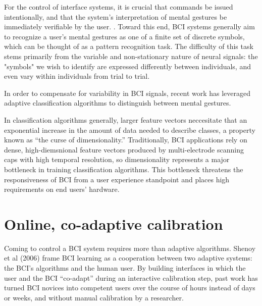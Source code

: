 For the control of interface systems, it is crucial that commands be issued intentionally, and that the system's interpretation of mental gestures be immediately verifiable by the user. \cite{millan_combining_2010,ali_empirical_2014}. Toward this end, BCI systems generally aim to recognize a user's mental gestures as one of a finite set of discrete symbols, which can be thought of as a pattern recognition task. \cite{lotte_review_2007} The difficulty of this task stems primarily from the variable and non-stationary nature of neural signals: the "symbols" we wish to identify are expressed differently between individuals, and even vary within individuals from trial to trial. \cite{vidaurre_fully_2006,vidaurre_machine-learning-based_2011} 

In order to compensate for variability in BCI signals, recent work has leveraged adaptive classification algorithms to distinguish between mental gestures. \cite{lotte_review_2007,vidaurre_machine-learning-based_2011} 


In classification algorithms generally, larger feature vectors neccesitate that an exponential increase in the amount of data needed to describe classes, a property known as ``the curse of dimensionality.'' \cite{jain_statistical_2000,raudys_small_1991} Traditionally, BCI applications rely on dense, high-diemsnional feature vectors produced by multi-electrode scanning caps with high temporal resolution, so dimensionality represents a major bottleneck in training classification algorithms. This bottleneck threatens the responsiveness of BCI from a user experience standpoint and places high requirements on end users' hardware.

\section{Online, co-adaptive calibration}

Coming to control a BCI system requires more than adaptive algorithms. Shenoy et al (2006) frame BCI learning as a cooperation between two adaptive systems: the BCI's algorithms and the human user. \cite{shenoy_towards_2006} By building interfaces in which the user and the BCI ``co-adapt'' during an interactive calibration step, past work has turned BCI novices into competent users over the course of hours instead of days or weeks, and without manual calibration by a researcher. \cite{vidaurre_fully_2006,vidaurre_co-adaptive_2011,vidaurre_machine-learning-based_2011}

